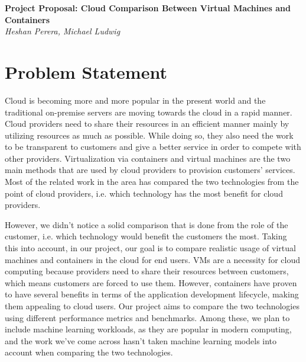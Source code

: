 \documentclass[11pt]{article}
\begin{document}
\renewcommand{\headrulewidth}{0pt} 
\renewcommand{\footrulewidth}{0pt} 
\pagestyle{fancy}
\cfoot{}
\lhead{}
\rhead{}
\lfoot{\itshape\textcolor{gray}{CS525T Cloud Computing Paper Review}}

\begin{center}
{\LARGE \bf Project Proposal: Cloud Comparison Between Virtual Machines and Containers} \\
{\normalsize \emph{Heshan Perera, Michael Ludwig}}\\

\end{center}

\section{Problem Statement}


Cloud is becoming more and more popular in the present world and the traditional on-premise servers are moving towards the cloud in a rapid manner. Cloud providers need to share their resources in an efficient manner mainly by utilizing resources as much as possible. While doing so, they also need the work to be transparent to customers and give a better service in order to compete with other providers. Virtualization via containers and virtual machines are the two main methods that are used by cloud providers to provision customers' services. Most of the related work in the area has compared the two technologies from the point of cloud providers, i.e. which technology has the most benefit for cloud providers.

However, we didn't notice a solid comparison that is done from the role of the customer, i.e. which technology would benefit the customers the most. Taking this into account, in our project, our goal is to compare realistic usage of virtual machines and containers in the cloud for end users. VMs are a necessity for cloud computing because providers need to share their resources between customers, which means customers are forced to use them. However, containers have proven to have several benefits in terms of the application development lifecycle, making them appealing to cloud users. Our project aims to compare the two technologies using different performance metrics and benchmarks. Among these, we plan to include machine learning workloads, as they are popular in modern computing, and the work we've come across hasn't taken machine learning models into account when comparing the two technologies.
\end{document}

